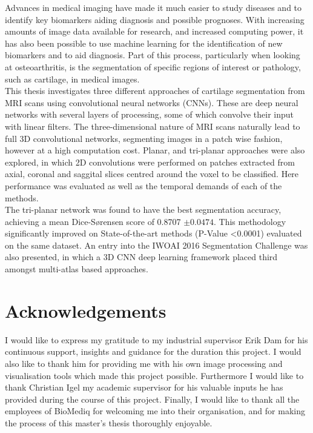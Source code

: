 \documentclass[11pt,a4paper]{memoir}
\numberwithin{figure}{section}
\numberwithin{table}{section}
\numberwithin{equation}{section}
\begin{document}
Advances in medical imaging have made it much easier to study diseases and to identify key biomarkers aiding diagnosis and possible prognoses. With increasing amounts of image data available for research, and increased computing power, it has also been possible to use machine learning for the identification of new biomarkers and to aid diagnosis. Part of this process, particularly when looking at osteoarthritis, is the segmentation of specific regions of interest or pathology, such as cartilage, in medical images. \\

This thesis investigates three different approaches of cartilage segmentation from MRI scans using convolutional neural networks (CNNs). These are deep neural networks with several layers of processing, some of which convolve their input with linear filters. The three-dimensional nature of MRI scans naturally lead to full 3D convolutional networks, segmenting images in a patch wise fashion, however at a high computation cost. Planar, and tri-planar approaches were also explored, in which 2D convolutions were performed on patches extracted from axial, coronal and saggital slices centred around the voxel to be classified. Here performance was evaluated as well as the temporal demands of each of the methods.\\

The tri-planar network was found to have the best segmentation accuracy, achieving a mean Dice-Sørensen score of 0.8707 $\pm0.0474$. This methodology significantly improved on State-of-the-art methods (P-Value \textless 0.0001) evaluated on the same dataset. An entry into the IWOAI 2016 Segmentation Challenge was also presented, in which a 3D CNN deep learning framework placed third amongst multi-atlas based approaches.


\chapter*{Acknowledgements}
I would like to express my gratitude to my industrial supervisor Erik Dam for his continuous support, insights and guidance for the duration this project. I would also like to thank him for providing me with his own image processing and visualisation tools which made this project possible. Furthermore I would like to thank Christian Igel my academic supervisor for his valuable inputs he has provided during the course of this project. Finally, I would like to thank all the employees of BioMediq for welcoming me into their organisation, and for making the process of this master's thesis thoroughly enjoyable.
\end{document}

